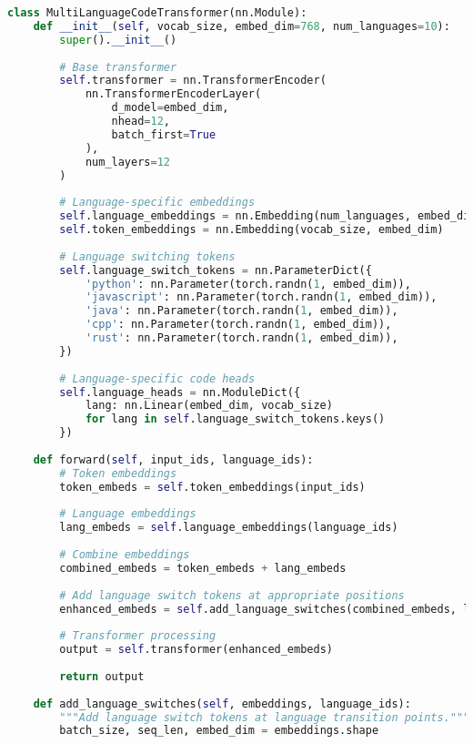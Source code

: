 \begin{lstlisting}[language=Python, caption=Language switching tokens for multi-language code generation]
class MultiLanguageCodeTransformer(nn.Module):
    def __init__(self, vocab_size, embed_dim=768, num_languages=10):
        super().__init__()
        
        # Base transformer
        self.transformer = nn.TransformerEncoder(
            nn.TransformerEncoderLayer(
                d_model=embed_dim,
                nhead=12,
                batch_first=True
            ),
            num_layers=12
        )
        
        # Language-specific embeddings
        self.language_embeddings = nn.Embedding(num_languages, embed_dim)
        self.token_embeddings = nn.Embedding(vocab_size, embed_dim)
        
        # Language switching tokens
        self.language_switch_tokens = nn.ParameterDict({
            'python': nn.Parameter(torch.randn(1, embed_dim)),
            'javascript': nn.Parameter(torch.randn(1, embed_dim)),
            'java': nn.Parameter(torch.randn(1, embed_dim)),
            'cpp': nn.Parameter(torch.randn(1, embed_dim)),
            'rust': nn.Parameter(torch.randn(1, embed_dim)),
        })
        
        # Language-specific code heads
        self.language_heads = nn.ModuleDict({
            lang: nn.Linear(embed_dim, vocab_size) 
            for lang in self.language_switch_tokens.keys()
        })
        
    def forward(self, input_ids, language_ids):
        # Token embeddings
        token_embeds = self.token_embeddings(input_ids)
        
        # Language embeddings
        lang_embeds = self.language_embeddings(language_ids)
        
        # Combine embeddings
        combined_embeds = token_embeds + lang_embeds
        
        # Add language switch tokens at appropriate positions
        enhanced_embeds = self.add_language_switches(combined_embeds, language_ids)
        
        # Transformer processing
        output = self.transformer(enhanced_embeds)
        
        return output
    
    def add_language_switches(self, embeddings, language_ids):
        """Add language switch tokens at language transition points."""
        batch_size, seq_len, embed_dim = embeddings.shape
        

\end{lstlisting}
